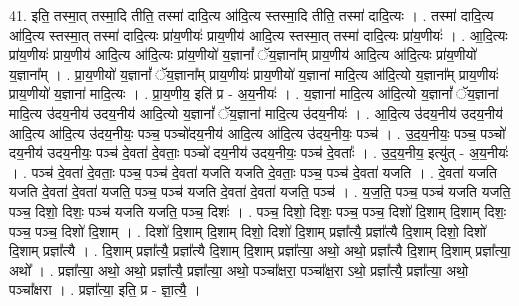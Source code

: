 \documentclass[17pt]{extarticle}
\begin{document}
41. इति॒ तस्मा॒त् तस्मा॒दि तीति॒ तस्मा॑ दादि॒त्य आ॑दि॒त्य स्तस्मा॒दि तीति॒ तस्मा॑ दादि॒त्यः । . तस्मा॑ दादि॒त्य आ॑दि॒त्य स्तस्मा॒त् तस्मा॑ दादि॒त्यः प्रा॑य॒णीयः॑ प्राय॒णीय॑ आदि॒त्य स्तस्मा॒त् तस्मा॑ दादि॒त्यः प्रा॑य॒णीयः॑ । . आ॒दि॒त्यः प्रा॑य॒णीयः॑ प्राय॒णीय॑ आदि॒त्य आ॑दि॒त्यः प्रा॑य॒णीयो॑ य॒ज्ञानां᳚ ॅय॒ज्ञाना᳚म् प्राय॒णीय॑ आदि॒त्य आ॑दि॒त्यः प्रा॑य॒णीयो॑ य॒ज्ञाना᳚म् । . प्रा॒य॒णीयो॑ य॒ज्ञानां᳚ ॅय॒ज्ञाना᳚म् प्राय॒णीयः॑ प्राय॒णीयो॑ य॒ज्ञाना॑ मादि॒त्य आ॑दि॒त्यो य॒ज्ञाना᳚म् प्राय॒णीयः॑ प्राय॒णीयो॑ य॒ज्ञाना॑ मादि॒त्यः । . प्रा॒य॒णीय॒ इति॑ प्र - अ॒य॒नीयः॑ । . य॒ज्ञाना॑ मादि॒त्य आ॑दि॒त्यो य॒ज्ञानां᳚ ॅय॒ज्ञाना॑ मादि॒त्य उ॑दय॒नीय॑ उदय॒नीय॑ आदि॒त्यो य॒ज्ञानां᳚ ॅय॒ज्ञाना॑ मादि॒त्य उ॑दय॒नीयः॑ । . आ॒दि॒त्य उ॑दय॒नीय॑ उदय॒नीय॑ आदि॒त्य आ॑दि॒त्य उ॑दय॒नीयः॒ पञ्च॒ पञ्चो॑दय॒नीय॑ आदि॒त्य आ॑दि॒त्य उ॑दय॒नीयः॒ पञ्च॑ । . उ॒द॒य॒नीयः॒ पञ्च॒ पञ्चो॑ दय॒नीय॑ उदय॒नीयः॒ पञ्च॑ दे॒वता॑ दे॒वताः॒ पञ्चो॑ दय॒नीय॑ उदय॒नीयः॒ पञ्च॑ दे॒वताः᳚ । . उ॒द॒य॒नीय॒ इत्यु॑त् - अ॒य॒नीयः॑ । . पञ्च॑ दे॒वता॑ दे॒वताः॒ पञ्च॒ पञ्च॑ दे॒वता॑ यजति यजति दे॒वताः॒ पञ्च॒ पञ्च॑ दे॒वता॑ यजति । . दे॒वता॑ यजति यजति दे॒वता॑ दे॒वता॑ यजति॒ पञ्च॒ पञ्च॑ यजति दे॒वता॑ दे॒वता॑ यजति॒ पञ्च॑ । . य॒ज॒ति॒ पञ्च॒ पञ्च॑ यजति यजति॒ पञ्च॒ दिशो॒ दिशः॒ पञ्च॑ यजति यजति॒ पञ्च॒ दिशः॑ । . पञ्च॒ दिशो॒ दिशः॒ पञ्च॒ पञ्च॒ दिशो॑ दि॒शाम् दि॒शाम् दिशः॒ पञ्च॒ पञ्च॒ दिशो॑ दि॒शाम् । . दिशो॑ दि॒शाम् दि॒शाम् दिशो॒ दिशो॑ दि॒शाम् प्रज्ञा᳚त्यै॒ प्रज्ञा᳚त्यै दि॒शाम् दिशो॒ दिशो॑ दि॒शाम् प्रज्ञा᳚त्यै । . दि॒शाम् प्रज्ञा᳚त्यै॒ प्रज्ञा᳚त्यै दि॒शाम् दि॒शाम् प्रज्ञा᳚त्या॒ अथो॒ अथो॒ प्रज्ञा᳚त्यै दि॒शाम् दि॒शाम् प्रज्ञा᳚त्या॒ अथो᳚ । . प्रज्ञा᳚त्या॒ अथो॒ अथो॒ प्रज्ञा᳚त्यै॒ प्रज्ञा᳚त्या॒ अथो॒ पञ्चा᳚क्षरा॒ पञ्चा᳚क्ष॒रा ऽथो॒ प्रज्ञा᳚त्यै॒ प्रज्ञा᳚त्या॒ अथो॒ पञ्चा᳚क्षरा । . प्रज्ञा᳚त्या॒ इति॒ प्र - ज्ञा॒त्यै॒ । \newline
\pagebreak
{}
\end{document}
